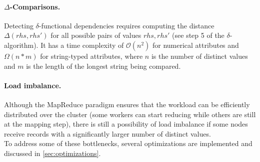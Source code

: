 \documentclass{article}
\begin{document}
        \paragraph{$\Delta$-Comparisons.}
        
        Detecting $\delta$-functional dependencies requires computing the distance $\Delta(rhs, rhs')$ for all possible pairs of values $rhs, rhs'$ (see step 5 of the $\delta$-algorithm). It has a time complexity of  $\mathcal{O}(n^2)$ for numerical attributes and $\Omega(n*m)$ for string-typed attributes, where $n$ is the number of distinct values and $m$ is the length of the longest string being compared. %
        
        \paragraph{Load imbalance.}
        
        Although the MapReduce paradigm ensures that the workload can be efficiently distributed over the cluster (some workers can start reducing while others are still at the mapping step), there is still a possibility of load imbalance if some nodes receive records with a significantly larger number of distinct values.\\
        
        \noindent To address some of these bottlenecks, several optimizations are implemented and discussed in \autoref{sec:optimizations}.

    
\end{document}

